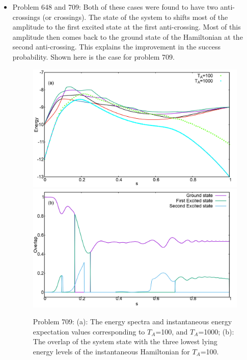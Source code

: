 \documentclass[../main.tex]{subfiles}
\begin{document}
\begin{appendices}
\begin{itemize}
\item Problem 648 and 709: Both of these cases were found to have two anti-crossings (or crossings). The state of the system to shifts most of the amplitude to the first excited state at the first anti-crossing. Most of this amplitude then comes back to the ground state of the Hamiltonian at the second anti-crossing. This explains the improvement in the success probability. Shown here is the case for problem 709.
\begin{figure}
\centering 
\includegraphics[scale=0.23]{709_A_g2.png}
\includegraphics[scale=0.23]{709_A_g2_Overlap.png}
\caption{Problem 709: (a): The energy spectra and instantaneous energy expectation values corresponding to $T_A$=100, and $T_A$=1000; (b): The overlap of the system state with the three lowest lying energy levels of the instantaneous Hamiltonian for $T_A$=100.}
\label{fig:ap7}
\end{figure}
\end{itemize}
\end{appendices}
\end{document}
